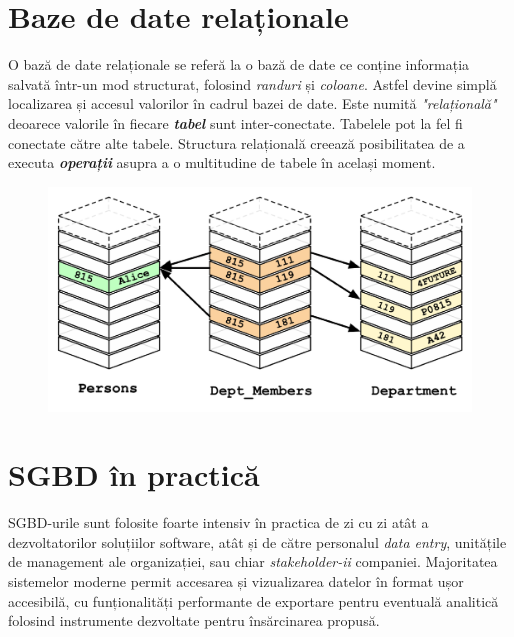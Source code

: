 \documentclass[12pt. a4paper]{report}
\begin{document}
\section{Baze de date relaționale}
O bază de date relaționale se referă la o bază de date ce conține informația salvată într-un mod structurat, folosind \emph{randuri} și \emph{coloane}. Astfel devine simplă localizarea și accesul valorilor în cadrul bazei de date. Este numită \emph{"relațională"} deoarece valorile în fiecare \emph{\textbf{tabel}} sunt inter-conectate. Tabelele pot la fel fi conectate către alte tabele. Structura relațională creează posibilitatea de a executa \emph{\textbf{operații}} asupra a o multitudine de tabele în același moment.

\begin{figure}
\center
\includegraphics[width=\textwidth]{relational_databases_demo}
\end{figure}

\section{SGBD în practică}
SGBD-urile sunt folosite foarte intensiv în practica de zi cu zi atât a dezvoltatorilor soluțiilor software, atât și de către personalul \emph{data entry}, unitățile de management ale organizației, sau chiar \emph{stakeholder-ii} companiei. Majoritatea sistemelor moderne permit accesarea și vizualizarea datelor în format ușor accesibilă, cu funționalități performante de exportare pentru eventuală analitică folosind instrumente dezvoltate pentru însărcinarea propusă. 
\end{document}
